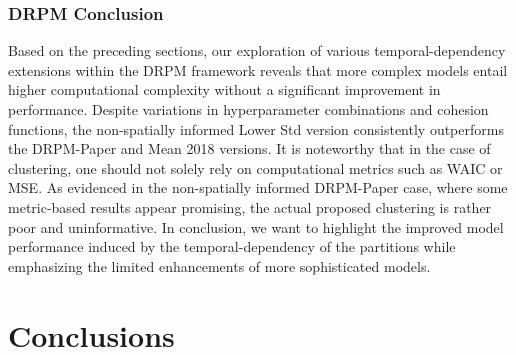 \documentclass[12pt,a4paper]{article}
\begin{document}
\subsubsection{DRPM Conclusion}

Based on the preceding sections, our exploration of various temporal-dependency extensions within the DRPM framework reveals that 
more complex models entail higher computational complexity without a significant improvement in performance. Despite variations in 
hyperparameter combinations and cohesion functions, the non-spatially informed Lower Std version consistently outperforms the
DRPM-Paper and Mean 2018 versions. It is noteworthy that in the case of clustering, one should not solely rely on computational 
metrics 
such as WAIC or MSE. As evidenced in the non-spatially informed DRPM-Paper case, where some metric-based results appear promising, 
the actual proposed clustering is rather poor and uninformative. In conclusion, we want to highlight the improved model performance 
induced by the temporal-dependency of the partitions while emphasizing the limited enhancements of more sophisticated models.

\newpage

\section{Conclusions}



\vspace{0.5cm}

\newpage

\nocite{*}
\newpage
\printbibliography
\end{document}
